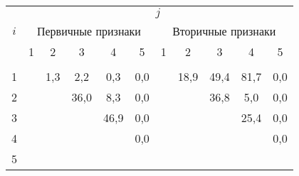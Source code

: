 \begin{multicols}{2}
\begin{table*}[b]
\begin{center}
\begin{tabular}{|c|c|c|c|c|c|c|c|c|c|c|}
\hline
& \multicolumn{10}{c|}{$j$}\\
\cline{2-11}
$i$&\multicolumn{5}{c|}{Первичные признаки}&\multicolumn{5}{c|}{Вторичные признаки}\\
\cline{2-11}
& 1&2&3&4&5& 1&2&3&4&5\\
\multicolumn{1}{|p{20pt}|}{\hspace*{20pt}}&
\multicolumn{1}{p{20pt}|}{\hspace*{20pt}}&
\multicolumn{1}{p{20pt}|}{\hspace*{20pt}}&
\multicolumn{1}{p{20pt}|}{\hspace*{20pt}}&
\multicolumn{1}{p{20pt}|}{\hspace*{20pt}}&
\multicolumn{1}{p{20pt}|}{\hspace*{20pt}}&
\multicolumn{1}{p{20pt}|}{\hspace*{20pt}}&
\multicolumn{1}{p{20pt}|}{\hspace*{20pt}}&
\multicolumn{1}{p{20pt}|}{\hspace*{20pt}}&
\multicolumn{1}{p{20pt}|}{\hspace*{20pt}}&
\multicolumn{1}{p{20pt}|}{\hspace*{20pt}}\\[-12pt]
\hline
1&\cellcolor[gray]{.6}&1,3&\hphantom{9}2,2&\hphantom{9}0,3&0,0&\cellcolor[gray]{.6}&18,9&49,4&81,7&0,0\\
2&\cellcolor[gray]{.6}&\cellcolor[gray]{.6}&36,0&\hphantom{9}8,3&0,0&\cellcolor[gray]{.6}&\cellcolor[gray]{.6}&36,8&\hphantom{9}5,0&0,0\\
3&\cellcolor[gray]{.6}&\cellcolor[gray]{.6}&\cellcolor[gray]{.6}&46,9&0,0&
\cellcolor[gray]{.6}&\cellcolor[gray]{.6}&\cellcolor[gray]{.6}&25,4&0,0\\
4&\cellcolor[gray]{.6}&\cellcolor[gray]{.6}&\cellcolor[gray]{.6}&\cellcolor[gray]{.6}&0,0&
\cellcolor[gray]{.6}&\cellcolor[gray]{.6}&\cellcolor[gray]{.6}&\cellcolor[gray]{.6}&0,0\\
5&\cellcolor[gray]{.6}&\cellcolor[gray]{.6}&\cellcolor[gray]{.6}&\cellcolor[gray]{.6}&
\cellcolor[gray]{.6}&\cellcolor[gray]{.6}&\cellcolor[gray]{.6}&\cellcolor[gray]{.6}&\cellcolor[gray]{.6}&\cellcolor[gray]{.6}\\
      \hline
      \end{tabular}
      \end{center}
      \begin{center}
      \vspace*{2ex}
      

\end{center}
\end{table*}
\end{multicols}
